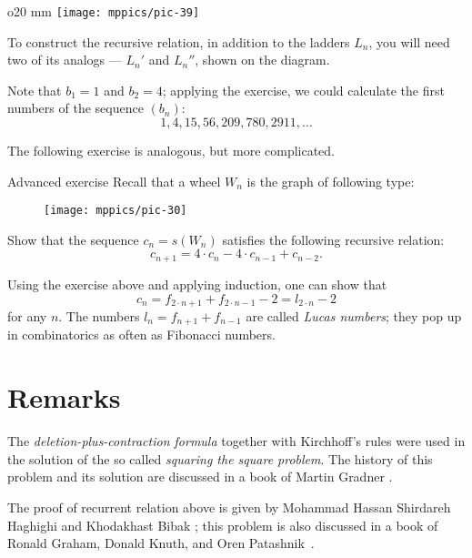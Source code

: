 \begin{wrapfigure}{o}{20 mm}
\vskip-4mm
\centering
\texttt{[image: mppics/pic-39]}
\end{wrapfigure}

 To construct the recursive relation, in addition to the ladders $L_n$, you will need two of its analogs --- $L_n'$ and $L_n''$, shown on the diagram.

\medskip

Note that $b_1=1$ and $b_2=4$; applying the exercise, we could calculate the first numbers of the sequence $(b_n)$:
\[1,4,15,56,209,780,2911,\dots \]

The following exercise is analogous, but more complicated.

\begin{thm}{Advanced exercise}
Recall that a wheel $W_n$ is the graph of following type:

\begin{figure}[h!]
\centering
\texttt{[image: mppics/pic-30]}
\end{figure}

Show that the sequence $c_n=s(W_n)$ satisfies the following recursive relation:
\[c_{n+1}=4\cdot c_n-4\cdot c_{n-1}+c_{n-2}.\]

\end{thm}

Using the exercise above and applying induction, one can show that 
\[c_n=f_{2\cdot n+1}+f_{2\cdot n-1}-2=l_{2\cdot  n}-2\]
for any $n$.
The numbers $l_n=f_{n+1}+f_{n-1}$ are called \emph{Lucas numbers};
they pop up in combinatorics as often as Fibonacci numbers.  

\section*{Remarks}

The \emph{deletion-plus-contraction formula} together with Kirchhoff's rules were used in the solution of the so called \emph{squaring the square problem}.
The history of this problem and its solution are discussed in a book of Martin Gradner \cite[Chapter 17]{gardiner}.

The proof of recurrent relation above is given by Mohammad Hassan Shirdareh Haghighi and Khodakhast Bibak \cite{haghighi-bibak};
this problem is also discussed in a book of Ronald Graham, Donald Knuth, and Oren Patashnik~\cite{knut}.
